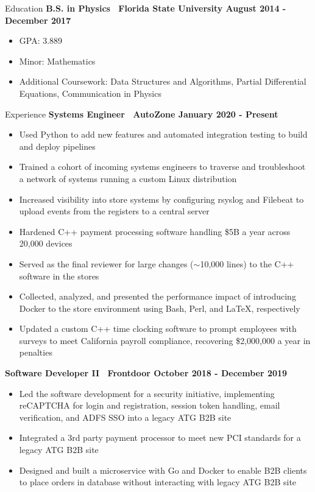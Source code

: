 \documentclass{resume} %
\begin{document}
\begin{rSection}{Education}
    {\bf B.S. in Physics \textbar\ Florida State University \hfill August 2014 - December 2017}
    \begin{itemize}
        \item GPA: 3.889
        \item Minor: Mathematics
        \item Additional Coursework: Data Structures and Algorithms, Partial Differential Equations, Communication in Physics
    \end{itemize}
\end{rSection}

\begin{rSection}{Experience}
    {\bf Systems Engineer \textbar\ AutoZone \hfill January 2020 - Present}
    \begin{itemize}
        \item Used Python to add new features and automated integration testing to build and deploy pipelines
        \item Trained a cohort of incoming systems engineers to traverse and troubleshoot a network of systems running a custom Linux distribution
        \item Increased visibility into store systems by configuring rsyslog and Filebeat to upload events from the registers to a central server
        \item Hardened C++ payment processing software handling \$5B a year across 20,000 devices
        \item Served as the final reviewer for large changes ($\sim$10,000 lines) to the C++ software in the stores
        \item Collected, analyzed, and presented the performance impact of introducing Docker to the store environment using Bash, Perl, and \LaTeX, respectively
        \item Updated a custom C++ time clocking software to prompt employees with surveys to meet California payroll compliance, recovering \$2,000,000 a year in penalties
    \end{itemize}

    {\bf Software Developer II \textbar\ Frontdoor \hfill October 2018 - December 2019}
    \begin{itemize}
        \item Led the software development for a security initiative, implementing reCAPTCHA for login and registration, session token handling, email verification, and ADFS SSO into a legacy ATG B2B site
        \item Integrated a 3rd party payment processor to meet new PCI standards for a legacy ATG B2B site
        \item Designed and built a microservice with Go and Docker to enable B2B clients to place orders in database without interacting with legacy ATG B2B site
    \end{itemize}
    

\end{rSection}
\end{document}
